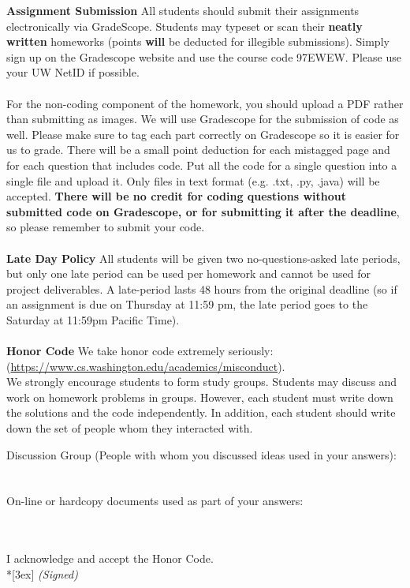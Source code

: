 \documentclass[11pt]{article}
\begin{document}
\textbf{Assignment Submission } All students should submit their assignments electronically via GradeScope. Students may typeset or scan their \textbf{neatly written} homeworks (points \textbf{will} be deducted for illegible submissions). Simply sign up on the Gradescope website and use the course code 97EWEW. Please use your UW NetID if possible.
\\
\\
For the non-coding component of the homework, you should upload a PDF rather than submitting as images. We will use Gradescope for the submission of code as well. Please make sure to tag each part correctly on Gradescope so it is easier for us to grade. There will be a small point deduction for each mistagged page and for each question that includes code. Put all the code for a single question into a single file and upload it. Only files in text format (e.g. .txt, .py, .java) will be accepted. \textbf{There will be no credit for coding questions without submitted code on Gradescope, or for submitting it after the deadline}, so please remember to submit your code.
\\
\\
\textbf{Late Day Policy } All students will be given two no-questions-asked late periods, but only one late period can be used per homework and cannot be used for project deliverables. A late-period lasts 48 hours from the original deadline (so if an assignment is due on Thursday at 11:59 pm, the late period goes to the Saturday at 11:59pm Pacific Time).
\\
\\
\textbf{Honor Code } We take honor code extremely seriously:\\ (\url{https://www.cs.washington.edu/academics/misconduct}).\\
We strongly encourage students to form study groups. Students may discuss and work on homework problems in groups. However, each student must write down the solutions and the code independently. In addition, each student should write down the set of people whom they interacted with. 

\vfill
\vfill

Discussion Group (People with whom you discussed ideas used in your answers): \\\\\\
On-line or hardcopy documents used as part of your answers: \\\\\\
\vfill

\vfill

I acknowledge and accept the Honor Code.\\*[3ex]
\bigskip
\textit{(Signed)}\hrulefill

\vfill
\vfill
\end{document}
